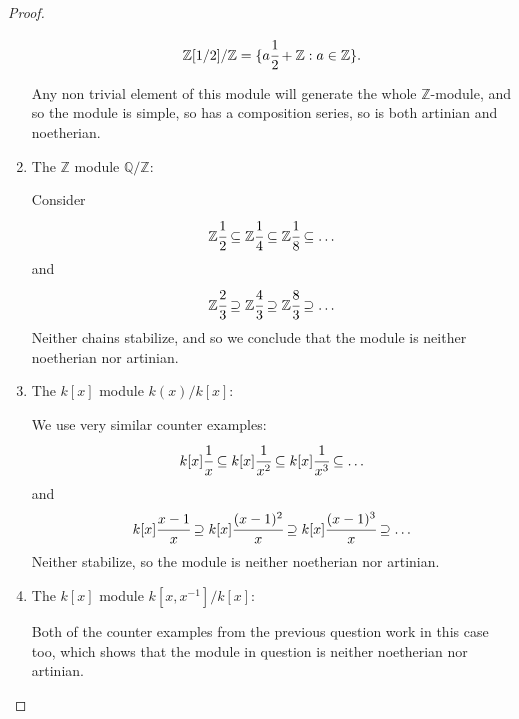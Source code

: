 \documentclass[12pt]{extarticle}
\newcommand{\set}[1]{\{#1\}}
\newcommand{\Q}{\mathbb{Q}}
\newcommand{\Z}{\mathbb{Z}}
\newcommand{\<}{\langle}
\renewcommand{\>}{\rangle}
\theoremstyle{definition}
\begin{document}
\begin{proof}
\begin{enumerate}
    \begin{align*}
      \Z[1/2]/\Z = \set{a\cfrac{1}{2} + \Z: a \in \Z}.
    \end{align*}

    Any non trivial element of this module will generate the whole $\Z$-module, and so the module is simple, so has a composition series, so is both artinian and noetherian.
    
  \item
    The $\Z$ module $\Q/\Z$:

    Consider 
    \begin{align*}
      \Z\cfrac{1}{2} \subseteq \Z\cfrac{1}{4} \subseteq \Z\cfrac{1}{8} \subseteq \dots 
    \end{align*}
    and
    \begin{align*}
      \Z\cfrac{2}{3} \supseteq \Z\cfrac{4}{3} \supseteq \Z\cfrac{8}{3} \supseteq \dots       
    \end{align*}
    Neither chains stabilize, and so we conclude that the module is neither noetherian nor artinian.

  \item
    The $k[x]$ module $k(x)/k[x]$:

    We use very similar counter examples:
    \begin{align*}
      k[x] \cfrac{1}{x} \subseteq k[x] \cfrac{1}{x^2} \subseteq k[x] \cfrac{1}{x^3} \subseteq \dots
    \end{align*}
    and
    \begin{align*}
      k[x] \cfrac{x-1}{x} \supseteq k[x] \cfrac{(x-1)^2}{x} \supseteq k[x] \cfrac{(x-1)^3}{x} \supseteq \dots 
    \end{align*}
    Neither stabilize, so the module is neither noetherian nor artinian.

  \item
    The $k[x]$ module $k[x,x^{-1}]/k[x]$:

    Both of the counter examples from the previous question work in this case too, which shows that the module in question is neither noetherian nor artinian. 

  \end{enumerate}
\end{proof}
\end{document}
